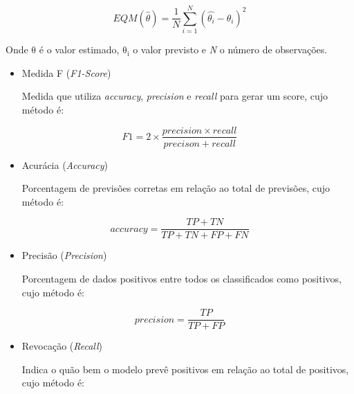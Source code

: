 \begin{equation}
    {\displaystyle EQM({\hat {\theta }})={\frac {1}{N}}\sum _{i=1}^{N}({\hat {\theta _{i}}}-\theta _{i})^{2}}
\end{equation}

Onde $\mathrm{\theta}$ é o valor estimado, $\mathrm{\theta_{i}}$ o valor previsto e \textit{N} o número de observações.




\begin{itemize}
\item{Medida F (\textit{F1-Score}) \par Medida que utiliza \textit{accuracy}, \textit{precision} e \textit{recall} para gerar um score, cujo método é:}
\end{itemize}


\begin{equation}
F1 = 2 \times \frac{precision \times recall}{precison + recall}
\end{equation}

\begin{itemize}
\item{Acurácia (\textit{Accuracy}) \par Porcentagem de previsões corretas em relação ao total de previsões, cujo método é:}
\end{itemize}


\begin{equation}
accuracy = \frac{TP + TN}{TP + TN + FP + FN}
\end{equation}

\begin{itemize}
\item{Precisão (\textit{Precision}) \par Porcentagem de dados positivos entre todos os classificados como positivos, cujo método é:}
\end{itemize}


\begin{equation}
precision = \frac{TP}{TP+FP}
\end{equation}

\begin{itemize}
\item{Revocação (\textit{Recall}) \par Indica o quão bem o modelo prevê positivos em relação ao total de positivos, cujo método é:}
\end{itemize}


